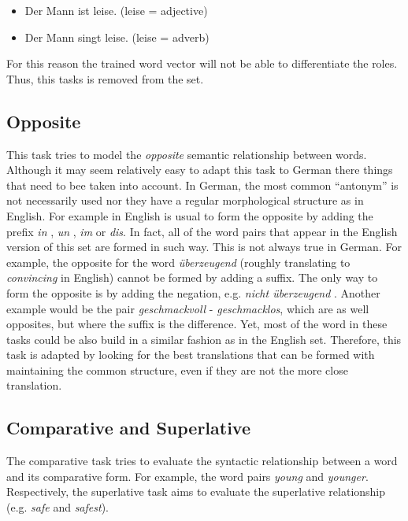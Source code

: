 \begin{itemize}
\item Der Mann ist leise. (leise = adjective)
\item Der Mann singt leise. (leise = adverb)
\end{itemize}

For this reason the trained word vector will not be able to differentiate the
roles. Thus, this tasks is removed from the set. 

\subsection{Opposite}
\label{sec:sub_sec_opposite}
This task tries to model the \emph{opposite} semantic relationship between words.
Although it may seem relatively easy to adapt this task to German there
things that need to bee taken into account. In German, the
most common ``antonym'' is not necessarily used nor they have a regular morphological
structure as in English. For example  in English is usual to form the
opposite by adding the prefix \textit{in} ,  \textit{un} , \textit{im} or
\textit{dis}. In fact, all of the word pairs that appear in the English
version of this set are formed in such way. This is not always true in
German. For example, the opposite for the word  \textit{\"{u}berzeugend} (roughly
translating to \emph{convincing} in English) cannot be formed by adding a suffix.
The only way to form the opposite is by adding the negation, e.g.
\textit{nicht  \"{u}berzeugend }. Another example would be the pair
\textit{geschmackvoll} - \textit{geschmacklos}, which are as well opposites,
but where the suffix is the difference.
Yet, most of the word in these tasks could be also build in a similar
fashion as in the English set. Therefore,  this task is adapted  by looking for
the best translations that can be formed with maintaining the common
structure, even if they are not the more close translation. 

\subsection{Comparative and Superlative}
\label{sec:sub_sec_comparative_sup}

The comparative task  tries to evaluate the syntactic relationship between a word
and its comparative form. For example, the word pairs  \textit{young} and
\textit{younger}. Respectively, the superlative task aims to evaluate the
superlative relationship  (e.g. \textit{safe}  and \textit{safest}).
 

